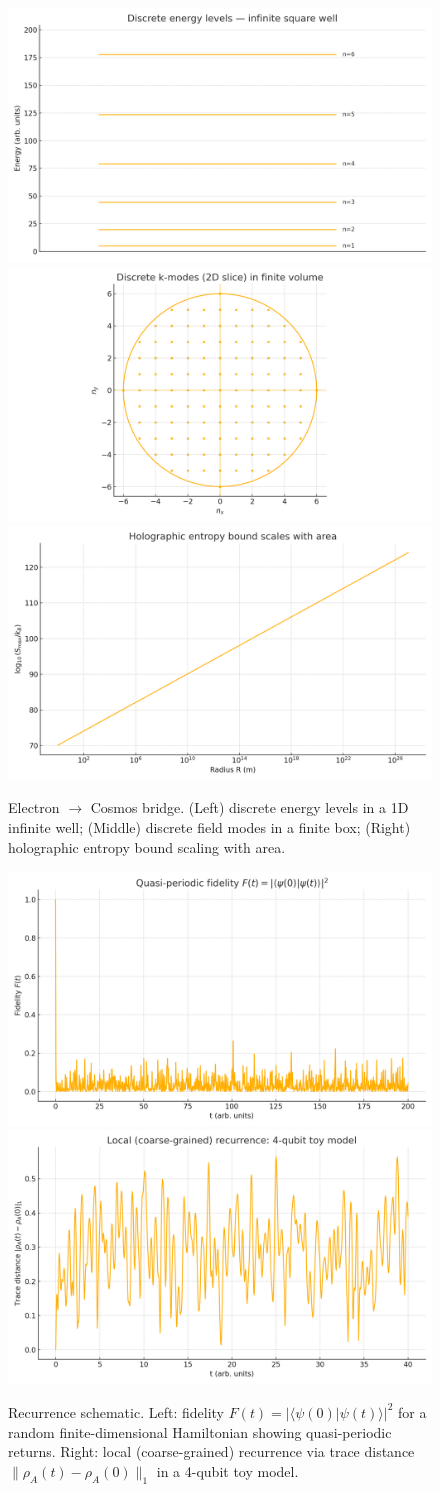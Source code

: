 \documentclass[12pt]{article}
\theoremstyle{remark}
\begin{document}
\begin{figure}[h]
  \centering
\includegraphics[width=0.32\linewidth]{fig_energy_levels}
\includegraphics[width=0.32\linewidth]{fig_k_modes}
\includegraphics[width=0.32\linewidth]{fig_holographic_bound}
  \caption{Electron $\to$ Cosmos bridge. (Left) discrete energy levels in a 1D infinite well; (Middle) discrete field modes in a finite box; (Right) holographic entropy bound scaling with area.}
\end{figure}


\begin{figure}[h]
  \centering
\includegraphics[width=0.48\linewidth]{figs/fig_fidelity.png}
\includegraphics[width=0.48\linewidth]{figs/fig_trace_distance.png}
  \caption{Recurrence schematic. Left: fidelity $F(t)=|\langle\psi(0)|\psi(t)\rangle|^2$ for a random finite-dimensional Hamiltonian showing quasi-periodic returns. Right: local (coarse-grained) recurrence via trace distance $\|\rho_A(t)-\rho_A(0)\|_1$ in a 4-qubit toy model.}
\end{figure}
\end{document}
